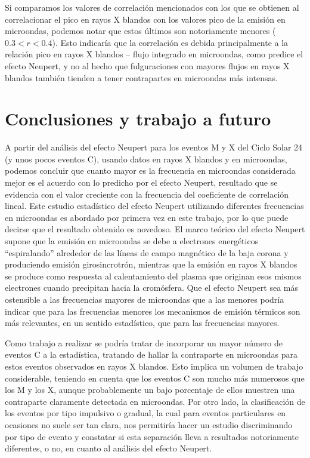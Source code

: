 \documentclass[baaa]{baaa}
\begin{document}
Si comparamos los valores de correlaci\'on mencionados con los que se obtienen al correlacionar 
el pico en rayos X blandos con los valores pico de la emisi\'on en microondas, podemos notar que estos \'ultimos son 
notoriamente menores ($0.3<r<0.4$). Esto indicar\'ia que la correlaci\'on es debida principalmente a la relaci\'on 
pico en rayos X blandos -- flujo integrado en microondas, como predice el efecto Neupert, y no al hecho que fulguraciones 
con mayo\-res flujos en rayos X blandos tambi\'en tienden a tener contrapartes en microondas m\'as intensas. 
 

\section{Conclusiones y trabajo a futuro}
A partir del an\'alisis del efecto Neupert para los eventos M y X del Ciclo Solar 24 (y unos pocos eventos C), 
u\-san\-do datos en 
rayos X blandos y en microondas, podemos concluir que cuanto mayor es la frecuencia en microondas considerada  
mejor es el acuerdo con lo predicho por el efecto Neupert, resultado que se evidencia con el valor creciente con la 
frecuencia del coeficiente de correlaci\'on lineal. Este estudio estad\'istico del efecto Neupert utilizando diferentes 
frecuencias en microondas es abordado por primera vez en este trabajo, por lo que puede decirse que el resultado 
obtenido es novedoso. El marco te\'orico del efecto Neupert supone que la emisi\'on en 
microondas se debe a electrones energ\'eticos ``espiralando'' alrededor de las l\'ineas de campo magn\'etico de la baja corona 
y produciendo emisi\'on girosincrotr\'on, mientras que la emisi\'on en rayos X blandos se produce como respuesta al 
calentamiento del plasma que originan esos mismos electrones cuando precipitan hacia la crom\'osfera. Que el efecto 
Neupert sea m\'as ostensible a las frecuencias mayores de microondas que a las menores podr\'ia indicar que 
para las frecuencias menores los mecanismos de emisi\'on t\'ermicos son m\'as relevantes, en un sentido estad\'istico, 
que para las frecuencias mayores.

Como trabajo a realizar se podr\'ia tratar de incorporar un mayor n\'umero de eventos C a la estad\'istica, 
tratando de hallar la contraparte en microondas para estos eventos observados en rayos X blandos. Esto implica un volumen 
de trabajo considerable, teniendo en cuenta que los eventos C son mucho m\'as numerosos que los M y los X, aunque 
probablemente un bajo porcentaje de ellos muestren una contraparte claramente detectada en microondas. Por otro lado,  
la clasificaci\'on de los eventos por tipo impulsivo o gradual, la cual para eventos particulares en ocasiones no suele 
ser tan clara, nos permitir\'ia hacer un estudio discriminando por tipo de evento y constatar si esta separaci\'on lleva 
a resultados notoriamente diferentes, o no, en cuanto al an\'alisis del efecto Neupert.
\end{document}
